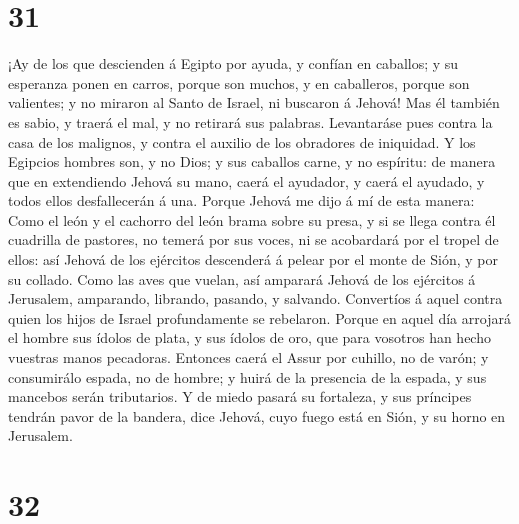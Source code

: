 \hypertarget{section-30}{%
\section{31}\label{section-30}}

 ¡Ay de los que descienden á Egipto por ayuda, y confían
en caballos; y su esperanza ponen en carros, porque son muchos, y en
caballeros, porque son valientes; y no miraron al Santo de Israel, ni
buscaron á Jehová!  Mas él también es sabio, y traerá el
mal, y no retirará sus palabras. Levantaráse pues contra la casa de los
malignos, y contra el auxilio de los obradores de iniquidad.
 Y los Egipcios hombres son, y no Dios; y sus caballos
carne, y no espíritu: de manera que en extendiendo Jehová su mano, caerá
el ayudador, y caerá el ayudado, y todos ellos desfallecerán á una.
 Porque Jehová me dijo á mí de esta manera: Como el león y
el cachorro del león brama sobre su presa, y si se llega contra él
cuadrilla de pastores, no temerá por sus voces, ni se acobardará por el
tropel de ellos: así Jehová de los ejércitos descenderá á pelear por el
monte de Sión, y por su collado.  Como las aves que
vuelan, así amparará Jehová de los ejércitos á Jerusalem, amparando,
librando, pasando, y salvando.  Convertíos á aquel contra
quien los hijos de Israel profundamente se rebelaron. 
Porque en aquel día arrojará el hombre sus ídolos de plata, y sus ídolos
de oro, que para vosotros han hecho vuestras manos pecadoras.
 Entonces caerá el Assur por cuhillo, no de varón; y
consumirálo espada, no de hombre; y huirá de la presencia de la espada,
y sus mancebos serán tributarios.  Y de miedo pasará su
fortaleza, y sus príncipes tendrán pavor de la bandera, dice Jehová,
cuyo fuego está en Sión, y su horno en Jerusalem.

\hypertarget{section-31}{%
\section{32}\label{section-31}}


